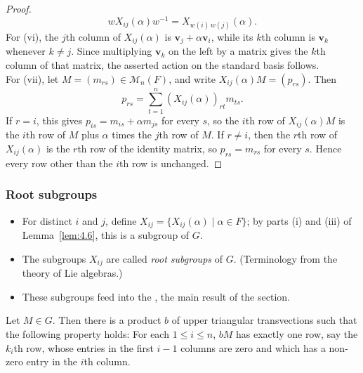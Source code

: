 \documentclass[../Odyssey_Project.tex]{subfiles}
\begin{document}
\begin{proof}
\[
    wX_{ij}(\alpha)w^{-1}=X_{w(i)\,w(j)}(\alpha).
\]
For (vi), the $j$th column of $X_{ij}(\alpha)$ is $\mathbf{v}_j+\alpha\mathbf{v}_i$, while its $k$th column is $\mathbf{v}_k$ whenever $k\neq j$. Since multiplying $\mathbf{v}_k$ on the left by a matrix gives the $k$th column of that matrix, the asserted action on the standard basis follows.\\
For (vii), let $M=(m_{rs})\in\mathcal{M}_n(F)$, and write $X_{ij}(\alpha)M=(p_{rs})$. Then
\[
    p_{rs}=\sum_{t=1}^{n}(X_{ij}(\alpha))_{rt}m_{ts}.
\]
If $r=i$, this gives $p_{is}=m_{is}+\alpha m_{js}$ for every $s$, so the $i$th row of $X_{ij}(\alpha)M$ is the $i$th row of $M$ plus $\alpha$ times the $j$th row of $M$. If $r\neq i$, then the $r$th row of $X_{ij}(\alpha)$ is the $r$th row of the identity matrix, so $p_{rs}=m_{rs}$ for every $s$. Hence every row other than the $i$th row is unchanged.
\end{proof}

\subsubsection*{Root subgroups}
\begin{itemize}
    \item For distinct $i$ and $j$, define $X_{ij} = \{X_{ij}(\alpha) \mid \alpha \in F\}$; by parts (i) and (iii) of Lemma~\ref{lem:4.6}, this is a subgroup of $G$.
    \item The subgroups $X_{ij}$ are called \emph{root subgroups} of $G$. (Terminology from the theory of Lie algebras.)
    \item These subgroups feed into the , the main result of the section.
\end{itemize}

\begin{lemma}
\label{lem:4.7}
Let $M \in G$. Then there is a product $b$ of upper triangular transvections such that the following property holds: For each $1 \leq i \leq n$, $bM$ has exactly one row, say the $k_i$th row, whose entries in the first $i - 1$ columns are zero and which has a non-zero entry in the $i$th column.
\end{lemma}
\end{document}

